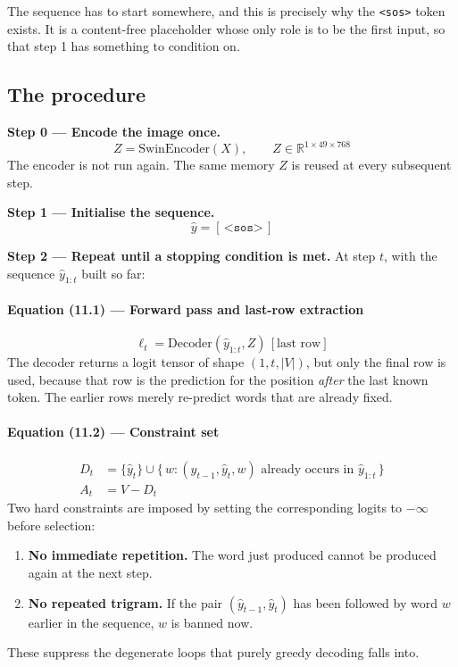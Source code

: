 \documentclass[12pt]{article}
\newcommand{\code}[1]{\texttt{#1}}
\begin{document}
The sequence has to start somewhere, and this is precisely why the \code{<sos>} token exists. It is a content-free placeholder whose only role is to be the first input, so that step 1 has something to condition on.

\subsection{The procedure}

\textbf{Step 0 --- Encode the image once.}
\begin{equation}
Z = \mathrm{SwinEncoder}(X), \qquad Z \in \mathbb{R}^{1\times49\times768}
\end{equation}
The encoder is not run again. The same memory $Z$ is reused at every subsequent step.

\textbf{Step 1 --- Initialise the sequence.}
\begin{equation}
\hat{y} = [\, \texttt{<sos>} \,]
\end{equation}

\textbf{Step 2 --- Repeat until a stopping condition is met.} At step $t$, with the sequence $\hat{y}_{1:t}$ built so far:

\paragraph{Equation (11.1) --- Forward pass and last-row extraction}
\begin{equation}
\ell_t = \mathrm{Decoder}(\hat{y}_{1:t}, Z)\,[\text{last row}]
\end{equation}
The decoder returns a logit tensor of shape $(1, t, |V|)$, but only the final row is used, because that row is the prediction for the position \emph{after} the last known token. The earlier rows merely re-predict words that are already fixed.

\paragraph{Equation (11.2) --- Constraint set}
\begin{align}
D_t &= \{\hat{y}_t\} \cup \{\, w : (\hat{y}_{t-1}, \hat{y}_t, w) \text{ already occurs in } \hat{y}_{1:t} \,\} \\
A_t &= V - D_t
\end{align}
Two hard constraints are imposed by setting the corresponding logits to $-\infty$ before selection:
\begin{enumerate}[nosep]
\item \textbf{No immediate repetition.} The word just produced cannot be produced again at the next step.
\item \textbf{No repeated trigram.} If the pair $(\hat{y}_{t-1}, \hat{y}_t)$ has been followed by word $w$ earlier in the sequence, $w$ is banned now.
\end{enumerate}
These suppress the degenerate loops that purely greedy decoding falls into.
\end{document}
